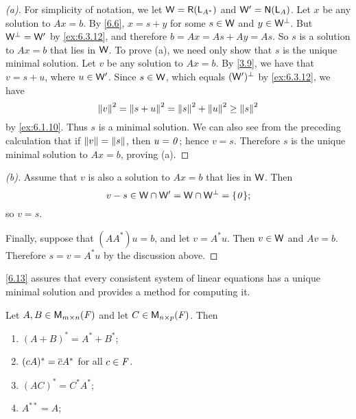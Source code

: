 \begin{proof}[(a)]
  For simplicity of notation, we let \(\W = \rg{\L_{A^*}}\) and \(\W' = \ns{\L_A}\).
  Let \(x\) be any solution to \(Ax = b\).
  By \cref{6.6}, \(x = s + y\) for some \(s \in \mathsf{W}\) and \(y \in \mathsf{W}^{\perp}\).
  But \(\mathsf{W}^{\perp} = \mathsf{W}'\) by \cref{ex:6.3.12}, and therefore \(b = Ax = As + Ay = As\).
  So \(s\) is a solution to \(Ax = b\) that lies in \(\mathsf{W}\).
  To prove (a), we need only show that \(s\) is the unique minimal solution.
  Let \(v\) be any solution to \(Ax = b\).
  By \cref{3.9}, we have that \(v = s + u\), where \(u \in \mathsf{W}'\).
  Since \(s \in \mathsf{W}\), which equals \((\mathsf{W}')^{\perp}\) by \cref{ex:6.3.12}, we have
  \[
    \left\lVert v\right\rVert^2 = \left\lVert s + u\right\rVert^2 = \left\lVert s\right\rVert^2 + \left\lVert u\right\rVert^2 \geq \left\lVert s\right\rVert^2
  \]
  by \cref{ex:6.1.10}.
  Thus \(s\) is a minimal solution.
  We can also see from the preceding calculation that if \(\left\lVert v\right\rVert = \left\lVert s\right\rVert\), then \(u = \mathit{0}\);
  hence \(v = s\).
  Therefore \(s\) is the unique minimal solution to \(Ax = b\), proving (a).
\end{proof}

\begin{proof}[(b)]
  Assume that \(v\) is also a solution to \(Ax = b\) that lies in \(\mathsf{W}\).
  Then
  \[
    v - s \in \W \cap \W' = \W \cap \W^{\perp} = \set{\zv};
  \]
  so \(v = s\).

  Finally, suppose that \((A A^*) u = b\), and let \(v = A^* u\).
  Then \(v \in \mathsf{W}\) and \(Av = b\).
  Therefore \(s = v = A^* u\) by the discussion above.
\end{proof}

\begin{note}
  \cref{6.13} assures that every consistent system of linear equations has a unique minimal solution and provides a method for computing it.
\end{note}

\exercisesection

\setcounter{ex}{4}
\begin{ex}\label{ex:6.3.5}
  Let \(A, B \in \ms\) and let \(C \in \ms[n][p][\F]\).
  Then
  \begin{enumerate}
    \item \((A + B)^* = A^* + B^*\);
    \item \((cA)^* = \overline{c} A^*\) for all \(c \in \mathit{F}\).
    \item \((AC)^* = C^* A^*\);
    \item \(A^{**} = A\);
  \end{enumerate}
\end{ex}

